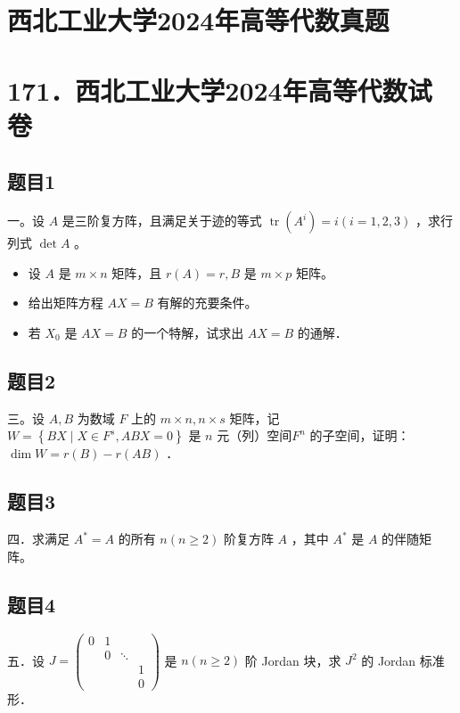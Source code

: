\documentclass{article}
\begin{document}
\section*{西北工业大学2024年高等代数真题}
\section*{171．西北工业大学2024年高等代数试卷}

\subsection{题目1}
一。设 \(A\) 是三阶复方阵，且满足关于迹的等式 \(\operatorname{tr}\left(A^{i}\right)=i(i=1,2,3)\) ，求行列式 \(\operatorname{det} A\) 。

\begin{itemize}
  \item[二．] 设 \(A\) 是 \(m \times n\) 矩阵，且 \(r(A)=r, B\) 是 \(m \times p\) 矩阵。
  \item[（1）] 给出矩阵方程 \(A X=B\) 有解的充要条件。
  \item[（2）] 若 \(X_{0}\) 是 \(A X=B\) 的一个特解，试求出 \(A X=B\) 的通解．
\end{itemize}

\subsection{题目2}
三。设 \(A, B\) 为数域 \(F\) 上的 \(m \times n, n \times s\) 矩阵，记 \(W=\left\{B X \mid X \in F^{s}, A B X=0\right\}\) 是 \(n\) 元（列）空间\(F^{n}\) 的子空间，证明： \(\operatorname{dim} W=r(B)-r(A B)\) ．

\subsection{题目3}
四．求满足 \(A^{*}=A\) 的所有 \(n(n \geq 2)\) 阶复方阵 \(A\) ，其中 \(A^{*}\) 是 \(A\) 的伴随矩阵。

\subsection{题目4}
五．设 \(J=\left(\begin{array}{rrrr}0 & 1 & & \\ & 0 & \ddots & \\ & & & 1 \\ & & & 0\end{array}\right)\) 是 \(n(n \geq 2)\) 阶 Jordan 块，求 \(J^{2}\) 的 Jordan 标准形．
\end{document}
